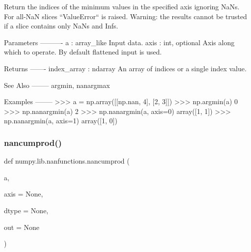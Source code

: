 \begin{DoxyVerb}Return the indices of the minimum values in the specified axis ignoring
NaNs. For all-NaN slices ``ValueError`` is raised. Warning: the results
cannot be trusted if a slice contains only NaNs and Infs.

Parameters
----------
a : array_like
    Input data.
axis : int, optional
    Axis along which to operate.  By default flattened input is used.

Returns
-------
index_array : ndarray
    An array of indices or a single index value.

See Also
--------
argmin, nanargmax

Examples
--------
>>> a = np.array([[np.nan, 4], [2, 3]])
>>> np.argmin(a)
0
>>> np.nanargmin(a)
2
>>> np.nanargmin(a, axis=0)
array([1, 1])
>>> np.nanargmin(a, axis=1)
array([1, 0])\end{DoxyVerb}
 \mbox{\label{namespacenumpy_1_1lib_1_1nanfunctions_a0bccbe7cb1e5d6900166312043d34e14}} 
\subsubsection{\texorpdfstring{nancumprod()}{nancumprod()}}
{\footnotesize\ttfamily def numpy.\+lib.\+nanfunctions.\+nancumprod (\begin{DoxyParamCaption}\item[{}]{a,  }\item[{}]{axis = {\ttfamily None},  }\item[{}]{dtype = {\ttfamily None},  }\item[{}]{out = {\ttfamily None} }\end{DoxyParamCaption})}

